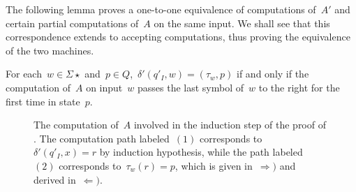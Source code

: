 The following lemma proves a one-to-one equivalence of computations of~$A'$ and certain partial computations of~$A$ on the same input. We shall see that this correspondence extends to accepting computations, thus proving the equivalence of the two machines.
\begin{lemm}\label{lem:transtab2DFA}
	For each~$w\in\Sigma\star$ and~$p\in Q$,~$\delta'(q'_I,w)=(\tau_w,p)$ if and only if the computation of~$A$ on input~$w$ passes the last symbol of~$w$ to the right for the first time in state~$p$.
\end{lemm}


\begin{figure}
	\centering
	
	\caption[Induction step of the proof of ]{The computation of~$A$ involved in the induction step of the proof of .
		The computation path labeled~$(1)$ corresponds to~$\delta'(q'_I,x)=r$ by induction hypothesis, while the path labeled~$(2)$ corresponds to~$\tau_w(r)=p$, which is given in~$\Rightarrow)$ and derived in~$\Leftarrow)$.}
	\label{fig:transtabproof}
\end{figure}

